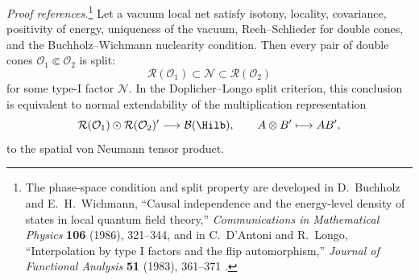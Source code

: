 \begin{quotedtheorem}
\label{thm:nuclearity-split-inclusions}
\emph{Proof references.}\footnote{The phase-space condition and split
property are developed in D.~Buchholz and E.~H.~Wichmann,
``Causal independence and the energy-level density of states in local quantum
field theory,'' \emph{Communications in Mathematical Physics} \textbf{106}
(1986), 321--344, and in C.~D'Antoni and R.~Longo, ``Interpolation by type I
factors and the flip automorphism,'' \emph{Journal of Functional Analysis}
\textbf{51} (1983), 361--371
\cite{BuchholzWichmann1986,DAntoniLongo1983}.}
Let a vacuum local net satisfy isotony, locality, covariance, positivity of
energy, uniqueness of the vacuum, Reeh--Schlieder for double cones, and the
Buchholz--Wichmann nuclearity condition.  Then every pair of double cones
\(\mathcal O_1\Subset\mathcal O_2\) is split:
\[
  \mathcal R(\mathcal O_1)
  \subset
  \mathcal N
  \subset
  \mathcal R(\mathcal O_2)
\]
for some type-I factor \(\mathcal N\).  In the Doplicher--Longo split
criterion, this conclusion is equivalent to normal extendability of the
multiplication representation
\[
  \mathcal R(\mathcal O_1)\odot \mathcal R(\mathcal O_2)'
  \longrightarrow \mathcal B(\Hilb),
  \qquad A\otimes B'\longmapsto AB',
\]
to the spatial von Neumann tensor product.
\end{quotedtheorem}


